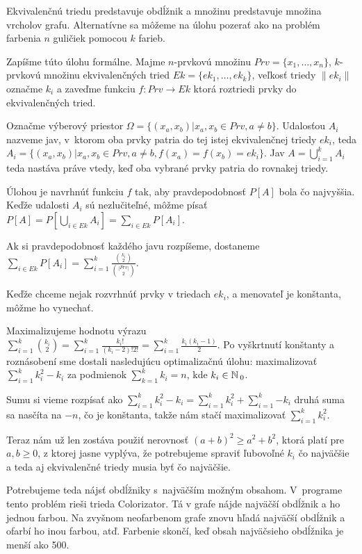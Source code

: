 \begin{note}
Ekvivalenčnú triedu predstavuje obdĺžnik a množinu predstavuje množina vrcholov grafu.
Alternatívne sa môžeme na úlohu pozerať ako na problém farbenia $n$ guličiek pomocou $k$ farieb.
\end{note}

Zapíšme túto úlohu formálne. Majme $n$-prvkovú množinu $Prv = \{x_1,\ldots,x_n\}$, $k$-prvkovú množinu ekvivalenčných tried $Ek = \{ek_1,\ldots, ek_k\}$, veľkosť 
triedy $\|ek_i\|$ označme $k_i$ a zaveďme funkciu $f \colon Prv \to Ek$ ktorá roztriedi prvky do ekvivalenčných tried.

Označme výberový priestor $\Omega = \{(x_a, x_b) | x_a, x_b \in Prv, a \not= b \}$.
Udalosťou $A_i$ nazveme jav, v~ktorom oba prvky patria do tej istej ekvivalenčnej triedy $ek_i$,
teda $A_i = \{(x_a, x_b) | x_a, x_b \in Prv, a \not= b, f(x_a) = f(x_b) = ek_i \}$.
Jav $A = \bigcup_{i=1}^{k} A_i$ teda nastáva práve vtedy,
 keď oba vybrané prvky patria do rovnakej triedy.

Úlohou je navrhnúť funkciu $f$ tak, aby pravdepodobnosť $P[A]$ bola čo najvyššia. 
Keďže udalosti $A_i$ sú nezlučiteľné, môžme písať 
$P[A] = P[\bigcup_{i \in Ek} A_i] = \sum_{i \in Ek}P[A_i]$.

Ak si pravdepodobnosť každého javu rozpíšeme, dostaneme 
$\sum_{i \in Ek}P[A_i] = \sum_{i = 1}^{k} \frac{{{k_i} \choose {2}}}{{{|Prv|} \choose {2}}}$.


Keďže chceme nejak rozvrhnúť prvky v triedach $ek_i$, a menovateľ je konštanta, môžme ho vynechať.

Maximalizujeme hodnotu výrazu 
$\sum_{i = 1}^{k} {{k_i} \choose {2}} = \sum_{i = 1}^{k} {\frac{k_i!}{(k_i -2 )!2!}} = \sum_{i = 1}^{k}{\frac{k_i (k_i-1)}{2}}$.
Po vyškrtnutí konštanty a roznásobení sme dostali nasledujúcu optimalizačnú úlohu:
maximalizovať $\sum_{i = 1}^{k} {k_i^2 - k_i}$ za podmienok $\sum_{k=1}^{k}k_i = n$,
kde $k_i \in \mathbb{N}\,_0$.

Sumu si vieme rozpísať ako 
$\sum_{i = 1}^{k} {k_i^2 - k_i} = \sum_{i = 1}^{k} {k_i^2} + \sum_{i = 1}^{k}{-k_i}$
druhá suma sa nasčíta na $-n$, čo je konštanta, takže nám stačí maximalizovať 
$\sum_{i = 1}^{k} {k_i^2}$.

Teraz nám už len zostáva použiť nerovnosť
$(a+b)^2 \geq a^2 + b^2$, ktorá platí pre $a,b \geq 0$, z ktorej jasne vyplýva, že potrebujeme spraviť ľubovoľné $k_i$ čo najväčšie
a teda aj ekvivalenčné triedy musia byť čo najväčšie.

Potrebujeme teda nájsť obdĺžniky s~najväčším možným obsahom. 
V~programe tento problém rieši trieda Colorizator.
Tá v grafe nájde najväčší obdĺžnik a  ho jednou farbou.
Na zvyšnom neofarbenom grafe znovu hľadá najväčší obdĺžnik a ofarbí ho inou farbou, atď.
Farbenie skončí, keď obsah najväčsieho obdĺžnika je menší ako 500.


